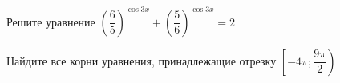 \begin{ex}
	\begin{condition}
		\begin{enumcols}[label=\asbuk*)]
			\item Решите уравнение \( \left(\dfrac{6}{5}\right)^{\cos 3x} + \left(\dfrac{5}{6}\right)^{\cos 3x} =2 \)
			\item Найдите все корни уравнения, принадлежащие отрезку \( \left[-4\pi;\dfrac{9\pi}{2}\right) \)
		\end{enumcols}
	\end{condition}
\end{ex}